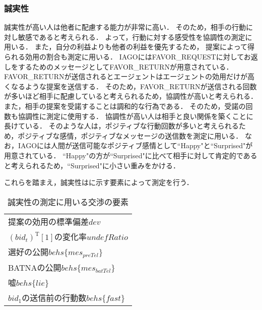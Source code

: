 \subsubsection{誠実性}
誠実性が高い人は他者に配慮する能力が非常に高い．
そのため，相手の行動に対し敏感であると考えられる．
よって，行動に対する感受性を協調性の測定に用いる．
また，自分の利益よりも他者の利益を優先するため，
提案によって得られる効用の割合も測定に用いる．
IAGOにはFAVOR\_REQUESTに対してお返しをするためのメッセージとしてFAVOR\_RETURNが用意されている．
FAVOR\_RETURNが送信されるとエージェントはエージェントの効用だけが高くなるような提案を送信する．
そのため，FAVOR\_RETURNが送信される回数が多いほど相手に配慮していると考えられるため，協調性が高いと考えられる．
また，相手の提案を受諾することは調和的な行為である．
そのため，受諾の回数も協調性に測定に使用する．
協調性が高い人は相手と良い関係を築くことに長けている．
そのような人は，ポジティブな行動回数が多いと考えられるため，ポジティブな感情，ポジティブなメッセージの送信数を測定に用いる．
なお，IAGOには人間が送信可能なポジティブ感情として“Happy"と“Surprised"が用意されている．
“Happy"の方が“Surprised"に比べて相手に対して肯定的であると考えられるため，“Surprised"に小さい重みをかける．

これらを踏まえ，誠実性はに示す要素によって測定を行う．

\begin{table}[tb]
    \centering
    \caption{誠実性の測定に用いる交渉の要素}
    \begin{tabular}{l} \toprule
        提案の効用の標準偏差$dev$ \\
        $(bid_t)^{\mathrm{T}}[1]$の変化率$undefRatio$  \\
        選好の公開$behs\{mes_{\mathit{preTel}}\}$ \\
        BATNAの公開$behs\{mes_{\mathit{batTel}}\}$ \\
        嘘$behs\{lie\}$ \\ 
        $bid_1$の送信前の行動数$behs\{fast\}$ \\ \bottomrule
    \end{tabular}
    \label{tab:conscientiousness}
\end{table}

